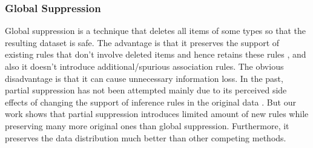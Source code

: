 \begin{table}[thb]
\end{table}

\subsubsection{Global Suppression}

Global suppression is a technique that deletes all items of some types
so that the resulting dataset is safe. 
The advantage is that it preserves the support of
existing rules that don't involve deleted items and hence retains these rules
\cite{Xu:2008:ATD}, and also it doesn't introduce
additional/spurious association rules.
The obvious disadvantage is that it can cause unnecessary
information loss. In the past, partial suppression
has not been attempted mainly due to its perceived side effects of 
changing the support of inference rules in the original data 
\cite{Xu:2008:ATD,Cao:2010:rho,tkde:VerykiosEBSD04:ARH,tkde:WuCC07:hiding}. 
But our work shows that partial suppression introduces limited
amount of new rules while preserving many more original ones than
global suppression. Furthermore,
it preserves the data distribution much better than
other competing methods.

